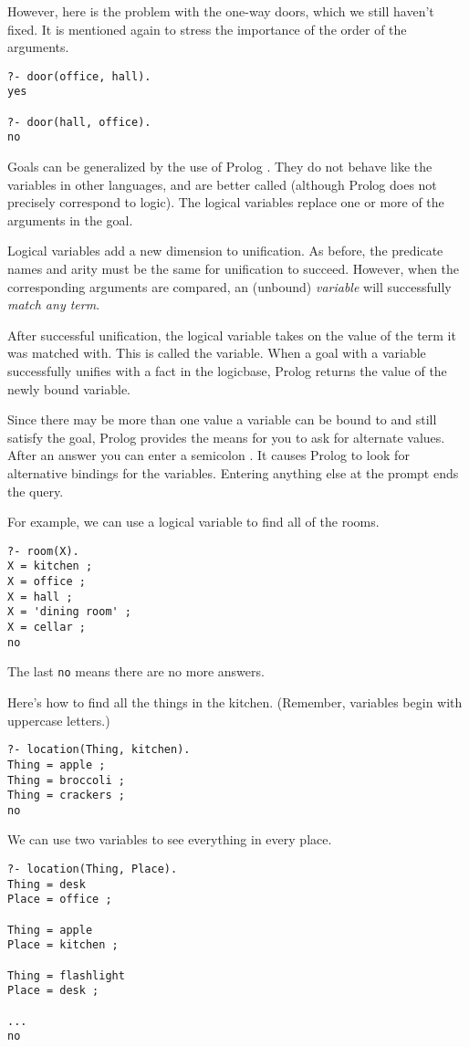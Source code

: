 However, here is the problem with the one-way doors, which we still haven't
fixed. It is mentioned again to stress the importance of the order of the
arguments.
\begin{verbatim}
?- door(office, hall).
yes

?- door(hall, office).
no
\end{verbatim}

Goals can be generalized by the use of Prolog
. They do not behave like the variables in
other languages, and are better called  (although Prolog
does not precisely correspond to logic). The logical variables replace one or
more of the arguments in the goal.

Logical variables add a new dimension to unification. As before, the predicate
names and arity must be the same for unification to succeed. However, when the
corresponding arguments are compared, an (unbound) \emph{variable} will
successfully \emph{match any term}.

After successful unification, the logical variable takes on the value of the
term it was matched with. This is called  the
variable. When a goal with a variable successfully unifies with a fact in the
logicbase, Prolog returns the value of the newly bound variable.

Since there may be more than one value a variable can be bound to and still
satisfy the goal, Prolog provides the means for you to ask for alternate values.
After an answer you can enter a semicolon \keys{;}. It causes Prolog to look
for alternative bindings for the variables. Entering anything else at the prompt
ends the query.

For example, we can use a logical variable to find all of the rooms.
\begin{verbatim}
?- room(X).
X = kitchen ;
X = office ;
X = hall ;
X = 'dining room' ;
X = cellar ;
no
\end{verbatim}
The last \verb'no' means there are no more answers.

Here's how to find all the things in the kitchen. (Remember, variables begin
with uppercase letters.)
\begin{verbatim}
?- location(Thing, kitchen).
Thing = apple ;
Thing = broccoli ;
Thing = crackers ;
no
\end{verbatim}

We can use two variables to see everything in every place.
\begin{verbatim}
?- location(Thing, Place).
Thing = desk
Place = office ;

Thing = apple
Place = kitchen ;

Thing = flashlight
Place = desk ;

...
no
\end{verbatim}

